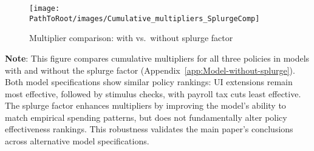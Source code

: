 \documentclass[\PathToRoot/\ProjectName]{subfiles}
\begin{document}
\begin{figure}[H]
  \centering
  \caption{Multiplier comparison: with vs.\ without splurge factor}
  \whenintegrated{\label{fig:cumulativemultipliers_SplurgeComp}} 
  \texttt{[image: \\PathToRoot/images/Cumulative\_multipliers\_SplurgeComp]}
\end{figure}
\noindent\parbox{\textwidth}{\footnotesize
  \textbf{Note}: This figure compares cumulative multipliers for all three policies
  in models with and without the splurge factor (Appendix~\ref{app:Model-without-splurge}).
  Both model specifications show similar policy rankings: UI extensions remain most effective,
  followed by stimulus checks, with payroll tax cuts least effective.
  The splurge factor enhances multipliers by improving the model's ability to match
  empirical spending patterns, but does not fundamentally alter policy effectiveness rankings.
  This robustness validates the main paper's conclusions across alternative model specifications.
}

\vspace{1em}  %

\smartbib
\end{document}
